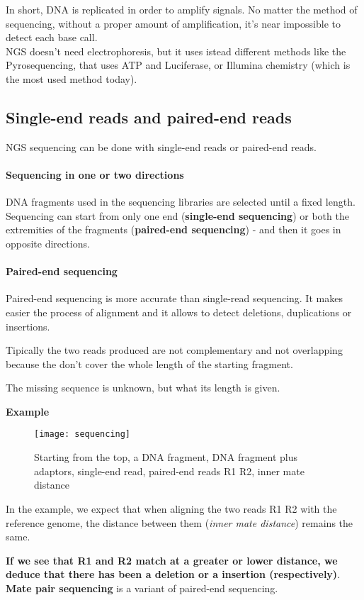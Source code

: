 In short, DNA is replicated in order to amplify signals. No matter the method
of sequencing, without a proper amount of amplification, it's near impossible
to detect each base call. \\

NGS doesn't need electrophoresis, but it uses istead different methods
like the Pyrosequencing, that uses ATP and Luciferase, or Illumina
chemistry (which is the most used method today).

\subsection{Single-end reads and paired-end reads}

NGS sequencing can be done with single-end reads or paired-end reads.

\paragraph*{Sequencing in one or two directions}

DNA fragments used in the sequencing libraries are selected until a fixed
length.
Sequencing can start from only one end (\textbf{single-end sequencing})
or both the extremities of the fragments (\textbf{paired-end sequencing})
- and then it goes in opposite directions.

\paragraph*{Paired-end sequencing}
Paired-end sequencing is more accurate than single-read sequencing.
It makes easier the process of alignment and it allows to detect deletions,
duplications or insertions.

Tipically the two reads produced are not complementary and not overlapping
because the don't cover the whole length of the starting fragment.

The missing sequence is unknown, but what its length is given.

\textbf{Example}

\begin{figure}[H]
  \centering
  \texttt{[image: sequencing]}
  \caption{Starting from the top, a DNA fragment, DNA fragment plus adaptors,
single-end read, paired-end reads R1 R2, inner mate distance}
  \label{fig:sequencing}
\end{figure}

In the example, we expect that when aligning the two reads R1 R2 with the
reference genome, the distance between them (\textit{inner mate distance})
remains the same.

\textbf{If we see that R1 and R2 match at a greater or lower distance, we
deduce that there has been a deletion or a insertion (respectively)}.\\

\textbf{Mate pair sequencing} is a variant of paired-end sequencing.

